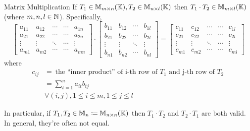 \begin{definition} {Matrix Multiplication}
    If \(T_1 \in \mathbb{M}_{m\times n}(\mathbb{K}), T_2 \in \mathbb{M}_{n\times l}(\mathbb{K})\) then \(T_1 \cdot T_2 \in \mathbb{M}_{m\times l}(\mathbb{K})\) (where \(m, n, l \in \mathbb{N}\)). Specifically, \[
        \begin{bmatrix}
            a_{11} & a_{12} & \cdots & \cdots & a_{1n} \\
            a_{21} & a_{22} & \cdots & \cdots & a_{2n} \\
            \vdots & \vdots & \ddots & \cdots & \vdots \\
            a_{m1} & a_{m2} & \cdots & \cdots & a_{mn}
        \end{bmatrix}
        \cdot
        \begin{bmatrix}
            b_{11} & b_{12} & \cdots & b_{1l} \\
            b_{21} & b_{22} & \cdots & b_{2l} \\
            \vdots & \vdots & \ddots & \vdots \\
            b_{n1} & b_{n2} & \cdots & b_{nl}
        \end{bmatrix}
        =
            \begin{bmatrix}
                c_{11} & c_{12} & \cdots & \cdots & c_{1l} \\
                c_{21} & c_{22} & \cdots & \cdots & c_{2l} \\
                \vdots & \vdots & \ddots & \cdots & \vdots \\
                c_{m1} & c_{m2} & \cdots & \cdots & c_{ml}
            \end{bmatrix}
    \]
    where
    \begin{align*}
        c_{ij} & = \:\text{the ``inner product'' of i-th row of \(T_1\) and j-th row of \(T_2\)}\: \\
               & = \sum_{t=1}^n a_{it}b_{tj}                                                       \\
               & \forall (i, j), 1 \leq i \leq m, 1 \leq j \leq l
    \end{align*}
\end{definition}

In particular, if \(T_1, T_2 \in \mathbb{M}_n \coloneqq \mathbb{M}_{n\times n}(\mathbb{K}) \) then \(T_1 \cdot T_2\) and \(T_2 \cdot T_1\) are both valid. In general, they're often not equal.

